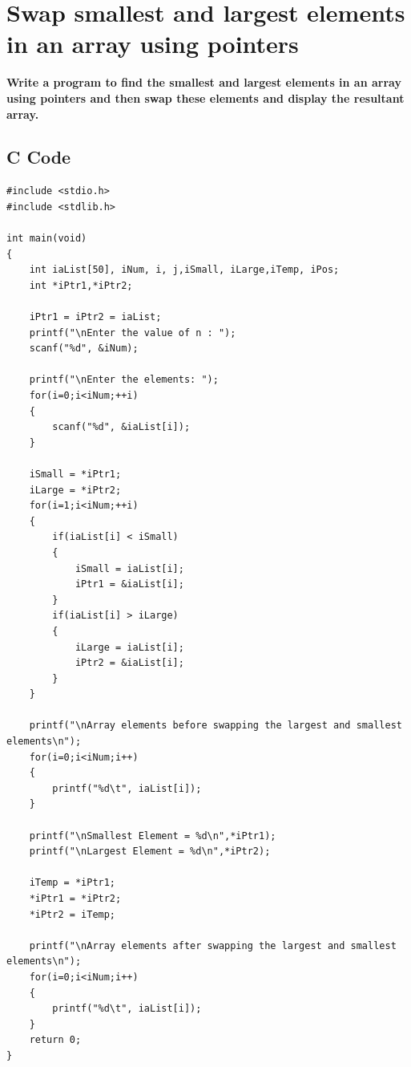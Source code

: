 \documentclass[a4paper]{report}
\begin{document}
\chapter{Swap smallest and largest elements in an array using pointers}
{\selectfont \textbf{Write a program to find the smallest and largest elements in an array using pointers and then swap these elements and display the resultant array. 
}}
\section*{C Code}
\begin{Verbatim}
#include <stdio.h>
#include <stdlib.h>

int main(void)
{
    int iaList[50], iNum, i, j,iSmall, iLarge,iTemp, iPos;
    int *iPtr1,*iPtr2;

    iPtr1 = iPtr2 = iaList;
    printf("\nEnter the value of n : ");
    scanf("%d", &iNum);

    printf("\nEnter the elements: ");
    for(i=0;i<iNum;++i)
    {
        scanf("%d", &iaList[i]);
    }

    iSmall = *iPtr1;
    iLarge = *iPtr2;
    for(i=1;i<iNum;++i)
    {
        if(iaList[i] < iSmall)
        {
            iSmall = iaList[i];
            iPtr1 = &iaList[i];
        }
        if(iaList[i] > iLarge)
        {
            iLarge = iaList[i];
            iPtr2 = &iaList[i];
        }
    }

    printf("\nArray elements before swapping the largest and smallest elements\n");
    for(i=0;i<iNum;i++)
    {
        printf("%d\t", iaList[i]);
    }

    printf("\nSmallest Element = %d\n",*iPtr1);
    printf("\nLargest Element = %d\n",*iPtr2);

    iTemp = *iPtr1;
    *iPtr1 = *iPtr2;
    *iPtr2 = iTemp;

    printf("\nArray elements after swapping the largest and smallest elements\n");
    for(i=0;i<iNum;i++)
    {
        printf("%d\t", iaList[i]);
    }
    return 0;
}

\end{Verbatim}
\end{document}
